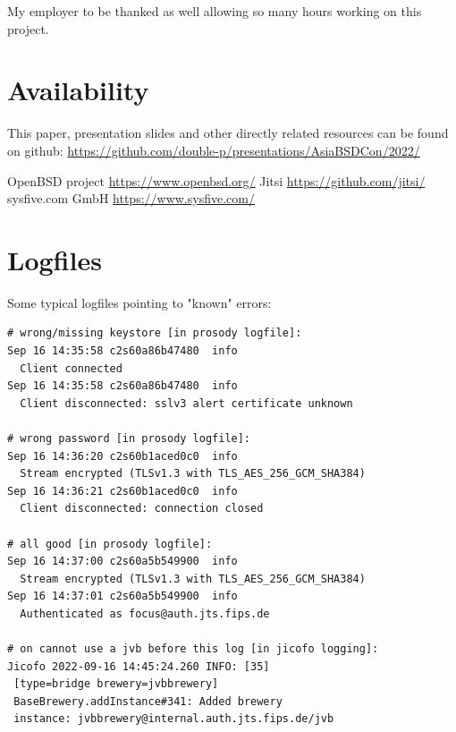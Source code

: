 \documentclass[conference]{IEEEtran}
\begin{document}
My employer to be thanked as well allowing so many hours working on this project.


\section{Availability}
This paper, presentation slides and other directly related resources can be found on github:
\url{https://github.com/double-p/presentations/AsiaBSDCon/2022/}


\begin{thebibliography}{00}
 OpenBSD project \url{https://www.openbsd.org/}
 Jitsi \url{https://github.com/jitsi/}
 sysfive.com GmbH \url{https://www.sysfive.com/}
\end{thebibliography}

\section{Logfiles}
Some typical logfiles pointing to "known" errors:
\begin{verbatim}
# wrong/missing keystore [in prosody logfile]:
Sep 16 14:35:58 c2s60a86b47480  info    
  Client connected
Sep 16 14:35:58 c2s60a86b47480  info    
  Client disconnected: sslv3 alert certificate unknown

# wrong password [in prosody logfile]:
Sep 16 14:36:20 c2s60b1aced0c0  info    
  Stream encrypted (TLSv1.3 with TLS_AES_256_GCM_SHA384)
Sep 16 14:36:21 c2s60b1aced0c0  info    
  Client disconnected: connection closed

# all good [in prosody logfile]:
Sep 16 14:37:00 c2s60a5b549900  info    
  Stream encrypted (TLSv1.3 with TLS_AES_256_GCM_SHA384)
Sep 16 14:37:01 c2s60a5b549900  info    
  Authenticated as focus@auth.jts.fips.de

# on cannot use a jvb before this log [in jicofo logging]:
Jicofo 2022-09-16 14:45:24.260 INFO: [35] 
 [type=bridge brewery=jvbbrewery] 
 BaseBrewery.addInstance#341: Added brewery 
 instance: jvbbrewery@internal.auth.jts.fips.de/jvb
\end{verbatim}
\end{document}
